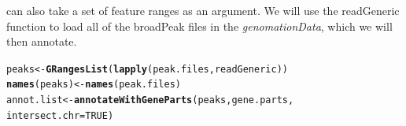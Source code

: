 \documentclass{article}\usepackage[]{graphicx}\usepackage[]{color}
\makeatletter
\newcommand{\hlnum}[1]{\textcolor[rgb]{0.686,0.059,0.569}{#1}}%
\newcommand{\hlstd}[1]{\textcolor[rgb]{0.345,0.345,0.345}{#1}}%
\newcommand{\hlkwb}[1]{\textcolor[rgb]{0.69,0.353,0.396}{#1}}%
\newcommand{\hlkwc}[1]{\textcolor[rgb]{0.333,0.667,0.333}{#1}}%
\newcommand{\hlkwd}[1]{\textcolor[rgb]{0.737,0.353,0.396}{\textbf{#1}}}%
\newenvironment{kframe}{%
 \def\at@end@of@kframe{}%
 \ifinner\ifhmode%
  \def\at@end@of@kframe{\end{minipage}}%
  \begin{minipage}{\columnwidth}%
 \fi\fi%
 \def\FrameCommand##1{\hskip\@totalleftmargin \hskip-\fboxsep
 \colorbox{shadecolor}{##1}\hskip-\fboxsep
     \hskip-\linewidth \hskip-\@totalleftmargin \hskip\columnwidth}%
 \MakeFramed {\advance\hsize-\width
   \@totalleftmargin\z@ \linewidth\hsize
   \@setminipage}}%
 {\par\unskip\endMakeFramed%
 \at@end@of@kframe}
\newenvironment{knitrout}{}{} %
\newcommand{\Rpackage}[1]{{\textit{#1}}}
\makeatother
\begin{document}
 can also take a set of feature ranges as an argument.
We will use the readGeneric function to load all of the broadPeak files in the
\Rpackage{genomationData}, which we will then annotate.
\begin{knitrout}
\color{fgcolor}\begin{kframe}
\begin{alltt}
\hlstd{peaks} \hlkwb{<-} \hlkwd{GRangesList}\hlstd{(}\hlkwd{lapply}\hlstd{(peak.files, readGeneric))}
\hlkwd{names}\hlstd{(peaks)} \hlkwb{<-} \hlkwd{names}\hlstd{(peak.files)}
\hlstd{annot.list} \hlkwb{<-} \hlkwd{annotateWithGeneParts}\hlstd{(peaks, gene.parts,}
    \hlkwc{intersect.chr} \hlstd{=} \hlnum{TRUE}\hlstd{)}
\end{alltt}


{\ttfamily\noindent\itshape\color{messagecolor}{\#\# Working on: Ctcf\\\#\# intersecting chromosomes...\\\#\# Working on: P300\\\#\# intersecting chromosomes...\\\#\# Working on: Suz12\\\#\# intersecting chromosomes...\\\#\# Working on: Rad21\\\#\# intersecting chromosomes...}}\end{kframe}
\end{knitrout}
\end{document}
